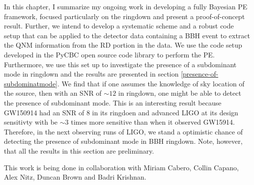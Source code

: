 In this chapter, I summarize my ongoing work in developing a fully Bayesian PE framework, focused particularly on the ringdown and present a proof-of-concept result. Further, we intend to develop a systematic scheme and a robust code setup that can be applied to the detector data containing a BBH event to extract the QNM information from the RD portion in the data. We use the code setup developed in the PyCBC open source code library to perform the PE. Furthermore, we use this set up to investigate the presence of a subdominant mode in ringdown and the results are presented in section \ref{presence-of-subdominatmode}. We find that if one assumes the knowledge of sky location of the source, then with an SNR of $\sim 12$ in ringdown, one might be able to detect the presence of subdominant mode. This is an interesting result because GW150914 had an SNR of 8 in its ringdoen and advanced LIGO at its design sensitivty with be $\sim 3$ times more sensitive than when it observed GW15914. Therefore, in the next observing runs of LIGO, we stand a optimistic chance of detecting the presence of subdominant mode in BBH ringdown. Note, however, that all the results in this section are preliminary. 

This work is being done in collaboration with Miriam Cabero, Collin Capano, Alex Nitz, Duncan Brown and Badri Krishnan.  








